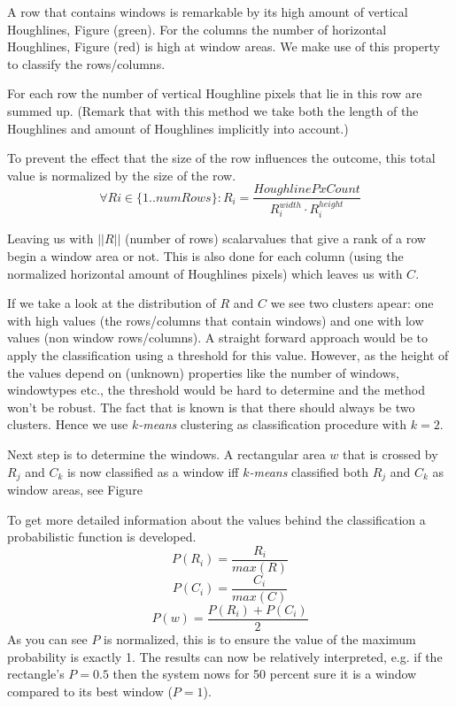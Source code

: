 A row that contains windows is remarkable by its high amount of vertical
Houghlines, Figure %
(green). For the columns the number of horizontal Houghlines, Figure %
 (red) is high at window areas.  We make use of this property to classify 
 the rows/columns.

For each row the number of vertical Houghline pixels that lie in this row are summed up.
(Remark that with this method we take both the length of the Houghlines and amount of Houghlines 
implicitly into account.)

To prevent the effect that the size of the row influences the outcome, this total value
is normalized by the size of the row.
\[\forall Ri\in \{1..numRows\} : R_i = \frac{HoughlinePxCount}{R_i^{width} \cdot R_i^{height}}\]

Leaving us with $||R||$ (number of rows) scalarvalues that give a rank of a row begin a window area or not.
This is also done for each column (using the normalized horizontal amount of
Houghlines pixels) which leaves us with $C$.

If we take a look at the distribution of $R$ and $C$ we see two clusters apear: one with
high values (the rows/columns that contain windows) and one with low values (non window
rows/columns).  A straight forward approach would be to apply the classification using a
threshold for this value.  However, as the height of the values depend on
(unknown) properties like the number of windows, windowtypes etc., the threshold
would be hard to determine and the method won't be robust. The fact that is
known is that there should always be two clusters. Hence we use \emph{$k$-means}
clustering as classification procedure with $k=2$.

Next step is to determine the windows.
A rectangular area $w$ that is crossed by $R_j$ and $C_k$ is now classified as a
window iff \emph{$k$-means} classified both $R_j$ and $C_k$ as window areas, see
Figure %

To get more detailed information about the values behind the classification a
probabilistic function is developed. 
\[P(R_i) = \frac{R_i}{max(R)}\]
\[P(C_i) = \frac{C_i}{max(C)}\]
\[P(w) = \frac{P(R_i) + P(C_i)}{2}\]
As you can see $P$ is normalized, this is to ensure the value of the maximum
probability is exactly 1. The results can now be relatively interpreted, e.g. if the rectangle's $P=0.5$
then the system nows for 50 percent sure it is a window compared to its best window ($P=1$).

